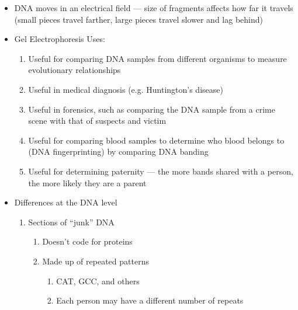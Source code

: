 \documentclass[12pt]{article}
\begin{document}
\begin{itemize}
\begin{enumerate}
    \end{enumerate}

  \item DNA moves in an electrical field — size of fragments affects how far it travels (small pieces travel farther, large pieces travel slower and lag behind)

  \item Gel Electrophoresis Uses:

    \begin{enumerate}

      \item Useful for comparing DNA samples from different organisms to measure evolutionary relationships

      \item Useful in medical diagnosis (e.g. Huntington's disease)
        
      \item Useful in forensics, such as comparing the DNA sample from a crime scene with that of suspects and victim

      \item Useful for comparing blood samples to determine who blood belongs to (DNA fingerprinting) by comparing DNA banding

      \item Useful for determining paternity — the more bands shared with a person, the more likely they are a parent

    \end{enumerate}

  \item Differences at the DNA level

    \begin{enumerate}

      \item Sections of “junk” DNA

        \begin{enumerate}

          \item Doesn't code for proteins

          \item Made up of repeated patterns

            \begin{enumerate}

              \item CAT, GCC, and others

              \item Each person may have a different number of repeats


\end{enumerate}
\end{enumerate}
\end{enumerate}
\end{itemize}
\end{document}
